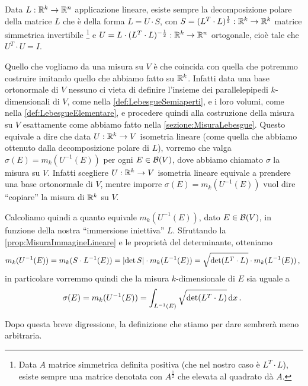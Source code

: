 Data $L:\mathbb R^k\to\mathbb R^n$ applicazione lineare, esiste sempre la decomposizione polare della matrice $L$ che è della forma $L=U\cdot S$, con $S=(L^T\cdot L)^{\frac 12}:\mathbb R^k\to\mathbb R^k$ matrice simmetrica invertibile \footnote{Data $A$ matrice simmetrica definita positiva (che nel nostro caso è $L^T\cdot L$), esiste sempre una matrice denotata con $A^\frac 12$ che elevata al quadrato dà $A$.} e $U=L\cdot (L^T\cdot L)^{-\frac 12}:\mathbb R^k\to\mathbb R^n$ ortogonale, cioè tale che $U^T\cdot U=I$.

Quello che vogliamo da una misura su $V$ è che coincida con quella che potremmo costruire imitando quello che abbiamo fatto su $\mathbb R^k$. Infatti data una base ortonormale di $V$ nessuno ci vieta di definire l'insieme dei parallelepipedi $k$-dimensionali di $V$, come nella \cref{def:LebesgueSemiaperti}, e i loro volumi, come nella \cref{def:LebesgueElementare}, e procedere quindi alla costruzione della misura su $V$ esattamente come abbiamo fatto nella \cref{sezione:MisuraLebesgue}.
Questo equivale a dire che data $U:\mathbb R^k\to V$ isometria lineare (come quella che abbiamo ottenuto dalla decomposizione polare di $L$), vorremo che valga $\sigma(E)=m_k(U^{-1}(E))$ per ogni $E\in\mathcal B(V)$, dove abbiamo chiamato $\sigma$ la misura su $V$. Infatti scegliere $U:\mathbb R^k\to V$ isometria lineare equivale a prendere una base ortonormale di $V$, mentre imporre $\sigma(E)=m_k(U^{-1}(E))$ vuol dire ``copiare'' la misura di $\mathbb R^k$ su $V$.

Calcoliamo quindi a quanto equivale $m_k(U^{-1}(E))$, dato $E\in\mathcal B(V)$, in funzione della nostra ``immersione iniettiva'' $L$. Sfruttando la \cref{prop:MisuraImmagineLineare} e le proprietà del determinante, otteniamo
\begin{equation*}
	m_k(U^{-1}(E))=m_k(S\cdot L^{-1}(E))=\lvert\det S\rvert\cdot m_k(L^{-1}(E))=\sqrt{\det(L^T\cdot L)}\cdot m_k(L^{-1}(E))\, \text{, }
\end{equation*}
in particolare vorremmo quindi che la misura $k$-dimensionale di $E$ sia uguale a
\begin{equation*}
	\sigma(E)=m_k(U^{-1}(E))=\int_{L^{-1}(E)}\sqrt{\det(L^T\cdot L)}\,\mathrm d x\, \text{. }
\end{equation*}

Dopo questa breve digressione, la definizione che stiamo per dare sembrerà meno arbitraria.

